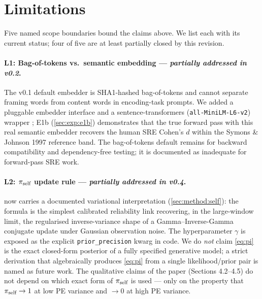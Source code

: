 \section{Limitations}
\label{sec:limitations}

Five named scope boundaries bound the claims above. We list each
with its current status; four of five are at least partially closed
by this revision.

\paragraph{L1: Bag-of-tokens vs.\ semantic embedding ---
\textit{partially addressed in v0.2}.} The v0.1 default embedder is
SHA1-hashed bag-of-tokens and cannot separate framing words from
content words in encoding-task prompts. We added a pluggable embedder
interface and a sentence-transformers
(\texttt{all-MiniLM-L6-v2}) wrapper \cite{reimers2019sbert}; E1b
(\cref{sec:exp:e1b}) demonstrates that the true forward pass with this
real semantic embedder recovers the human SRE Cohen's $d$ within the
Symons \& Johnson 1997 reference band. The bag-of-tokens default
remains for backward compatibility and dependency-free testing; it is
documented as inadequate for forward-pass SRE work.

\paragraph{L2: $\pi_{\text{self}}$ update rule ---
\textit{partially addressed in v0.4}.}
 now carries a documented variational interpretation
(\cref{sec:method:self}): the formula is the simplest calibrated
reliability link recovering, in the large-window limit, the
regularised inverse-variance shape of a Gamma--Inverse-Gamma
conjugate update under Gaussian observation noise. The
hyperparameter $\gamma$ is exposed as the explicit
\texttt{prior\_precision} kwarg in code. We do \emph{not} claim
\cref{eq:pi} is the exact closed-form posterior of a fully specified
generative model; a strict derivation that algebraically produces
\cref{eq:pi} from a single likelihood/prior pair is named as
future work. The qualitative claims of the paper (Sections 4.2--4.5) do
not depend on which exact form of $\pi_{\text{self}}$ is used --- only on the
property that $\pi_{\text{self}} \to 1$ at low PE variance and $\to 0$ at
high PE variance.

